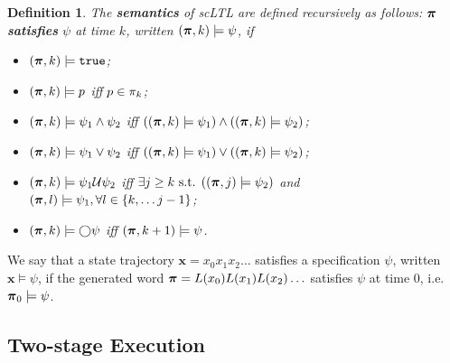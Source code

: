 \documentclass[conference]{IEEEtran}
\newtheorem{definition}{Definition}
\begin{document}
\begin{definition}
 The \textbf{semantics} of scLTL are defined recursively as follows: $\boldsymbol{\pi}$ \textbf{satisfies} $\psi$ at time $k$, written $(\boldsymbol{\pi}, k) \models \psi$, if
 \begin{itemize}
    \item $(\boldsymbol{\pi}, k) \models \texttt{true}$;
    \item $(\boldsymbol{\pi}, k) \models p$ iff $p \in \pi_k$;
    \item $(\boldsymbol{\pi}, k) \models \psi_1 \land  \psi_2  $ iff $ ( (\boldsymbol{\pi}, k) \models \psi_1 ) \land ( (\boldsymbol{\pi}, k) \models \psi_2 ) $;
    \item $(\boldsymbol{\pi}, k) \models \psi_1 \lor  \psi_2  $ iff $ ( (\boldsymbol{\pi}, k) \models \psi_1 ) \lor ( (\boldsymbol{\pi}, k) \models \psi_2 ) $;
    \item $(\boldsymbol{\pi}, k) \models  \psi_1 \mathcal{U} \psi_2 $ iff $\exists j \geq k \text{ s.t. } ((\boldsymbol{\pi}, j) \models \psi_2 ) $ and $(\boldsymbol{\pi}, l) \models \psi_1, \forall l \in \{k, \ldots j-1\}$;
    \item $(\boldsymbol{\pi}, k) \models \bigcirc \psi$ iff $(\boldsymbol{\pi}, k+1) \models \psi$.
 \end{itemize}

\end{definition}

We say that a state trajectory $\mathbf{x} = x_0 x_1 x_2 \ldots$ satisfies a specification $\psi$, written $\mathbf{x} \models \psi$, if the generated word $\boldsymbol{\pi} =L(x_0) L(x_1) L(x_2) \ldots$ satisfies $\psi$ at time 0, i.e. $\boldsymbol{\pi}_0 \models \psi$.


\subsection{Two-stage Execution}
\end{document}

